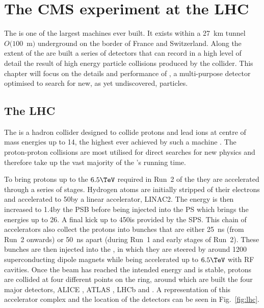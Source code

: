 \chapter{The CMS experiment at the LHC}
\label{chap:detector}


The \LHC is one of the largest machines ever built. It exists within a
27~km tunnel $O(100$~m$)$ underground on the border of France and
Switzerland. Along the extent of the \LHC are built a series of
detectors that can record in a high level of detail the result of high
energy particle collisions produced by the collider. This chapter
will focus on the details and performance of \CMS, a multi-purpose
detector optimised to search for new, as yet undiscovered, particles.

\section{The LHC}
\label{sec:lhc}

The \LHC is a hadron collider designed to collide protons and lead
ions at centre of mass energies up to 14\tev, the highest ever achieved by such a
machine
\cite{Evans:2008zzb,CERN-2004-003-V-1,CERN-2004-003-V-2,CERN-2004-003-V-3}.
The proton-proton collisions are most utilised for direct searches for
new physics and therefore take up the vast majority of the \LHC's
running time. 

To bring protons up to the $6.5\tev$ required in Run~2 of the \LHC they are
accelerated through a series of stages. Hydrogen atoms are initially stripped
of their electrons and accelerated to 50\mev by a linear accelerator,
\ac{LINAC2}. The energy is then increased to 1.4\gev by the \ac{PSB} before
being injected into the \ac{PS} which brings the energies up to 26\gev. A final
kick up to 450\gev is provided by the \ac{SPS}. This chain of accelerators also
collect the protons into bunches that are either 25~ns (from Run~2 onwards) or
50~ns apart (during Run~1 and early stages of Run~2). These bunches are then
injected into the \LHC, in which they are steered by around 1200
superconducting dipole magnets while being accelerated up to $6.5\tev$ with
\ac{RF} cavities. Once the beam has reached the intended energy and is stable,
protons are collided at four different points on the ring, around which are
built the four major \LHC detectors, ALICE \cite{Aamodt:2008zz}, ATLAS
\cite{Aad:2008zzm}, LHCb \cite{Alves:2008zz} and \CMS \cite{Chatrchyan:2008aa}.
A representation of this accelerator complex and the location of the
detectors can be seen in Fig.~\ref{fig:lhc}.

